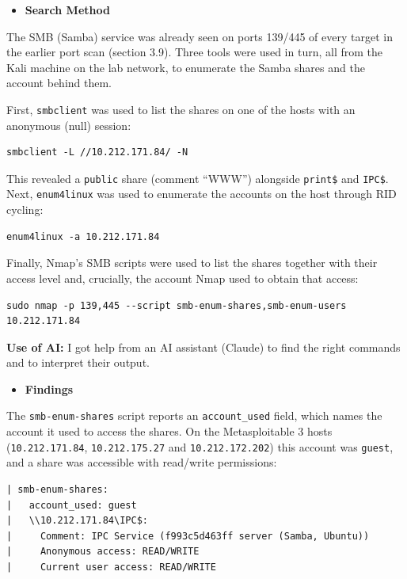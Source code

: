 \documentclass[11pt]{article}
\begin{document}
\begin{itemize}[leftmargin=1.5em]
    \item \textbf{Search Method}
\end{itemize}
\noindent The SMB (Samba) service was already seen on ports 139/445 of every target in the earlier port scan (section 3.9). Three tools were used in turn, all from the Kali machine on the lab network, to enumerate the Samba shares and the account behind them.

\noindent First, \texttt{smbclient} was used to list the shares on one of the hosts with an anonymous (null) session:

\begin{verbatim}
smbclient -L //10.212.171.84/ -N
\end{verbatim}

\noindent This revealed a \texttt{public} share (comment ``WWW'') alongside \texttt{print\$} and \texttt{IPC\$}. Next, \texttt{enum4linux} was used to enumerate the accounts on the host through RID cycling:

\begin{verbatim}
enum4linux -a 10.212.171.84
\end{verbatim}

\noindent Finally, Nmap's SMB scripts were used to list the shares together with their access level and, crucially, the account Nmap used to obtain that access:

\begin{verbatim}
sudo nmap -p 139,445 --script smb-enum-shares,smb-enum-users 10.212.171.84
\end{verbatim}

\noindent \textbf{Use of AI:} I got help from an AI assistant (Claude) to find the right commands and to interpret their output.

\begin{itemize}[leftmargin=1.5em]
    \item \textbf{Findings}
\end{itemize}
\noindent The \texttt{smb-enum-shares} script reports an \texttt{account\_used} field, which names the account it used to access the shares. On the Metasploitable 3 hosts (\texttt{10.212.171.84}, \texttt{10.212.175.27} and \texttt{10.212.172.202}) this account was \texttt{guest}, and a share was accessible with read/write permissions:

\begin{verbatim}
| smb-enum-shares:
|   account_used: guest
|   \\10.212.171.84\IPC$:
|     Comment: IPC Service (f993c5d463ff server (Samba, Ubuntu))
|     Anonymous access: READ/WRITE
|     Current user access: READ/WRITE
\end{verbatim}
\end{document}
